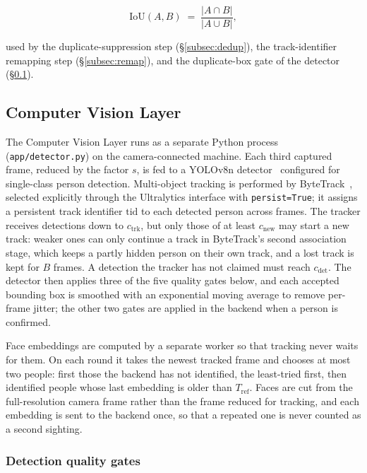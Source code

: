 \begin{equation}
\mathrm{IoU}(A, B) \;=\; \frac{|A \cap B|}{|A \cup B|},
\label{eq:iou}
\end{equation}

\noindent used by the duplicate-suppression step (\S\ref{subsec:dedup}),
the track-identifier remapping step (\S\ref{subsec:remap}), and the
duplicate-box gate of the detector (\S\ref{subsec:cv-layer}).

\subsection{Computer Vision Layer}
\label{subsec:cv-layer}

The Computer Vision Layer runs as a separate Python process
(\texttt{app/detector.py}) on the camera-connected machine. Each
third captured frame, reduced by the factor $s$, is fed to a YOLOv8n
detector~\cite{jocher2023}
configured for single-class person detection. Multi-object tracking is
performed by ByteTrack~\cite{zhang2022bytetrack}, selected explicitly
through the Ultralytics interface with \texttt{persist=True}; it assigns
a persistent track identifier $\mathrm{tid}$ to each detected person
across frames. The tracker receives detections down to
$c_{\mathrm{trk}}$, but only those of at least $c_{\mathrm{new}}$ may
start a new track: weaker ones can only continue a track in ByteTrack's
second association stage, which keeps a partly hidden person on their
own track, and a lost track is kept for $B$ frames. A detection the
tracker has not claimed must reach $c_{\mathrm{det}}$. The detector then
applies three of the five quality gates below, and each accepted
bounding box is smoothed with an exponential moving average to remove
per-frame jitter; the other two gates are applied in the backend when a
person is confirmed.

Face embeddings are computed by a separate worker so that tracking never
waits for them. On each round it takes the newest tracked frame and
chooses at most two people: first those the backend has not identified,
the least-tried first, then identified people whose last embedding is
older than $T_{\mathrm{ref}}$. Faces are cut from the full-resolution
camera frame rather than the frame reduced for tracking, and each
embedding is sent to the backend once, so that a repeated one is never
counted as a second sighting.

\subsubsection{Detection quality gates}

